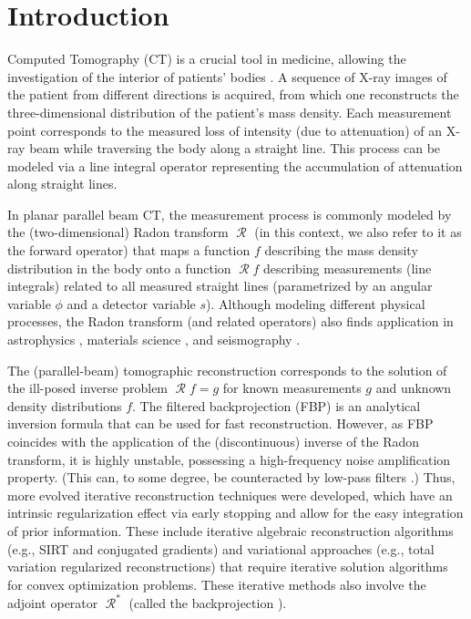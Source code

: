 \documentclass[11pt,reqno]{amsart}
\DeclareMathOperator{\Radon}{\mathcal{R}}
\numberwithin{theorem}{section}
\theoremstyle{remark}
\begin{document}
\section{Introduction}

Computed Tomography (CT) is a crucial tool in medicine, allowing the investigation of the interior of patients' bodies \cite{Ammari08_book_methematics_of_medical_imaging,Hsieh_CT_principles}.  
A sequence of X-ray images of the patient from different directions is acquired, from which one reconstructs the three-dimensional distribution of the patient's mass density.
Each measurement point corresponds to the measured loss of intensity (due to attenuation) of an X-ray beam while traversing the body along a straight line. This process can be modeled  via a line integral operator representing the accumulation of attenuation along straight lines.

 In planar parallel beam CT, the measurement process is commonly modeled by the (two-dimensional) Radon transform $\Radon$ \cite{Deans_Radon_applications_1993,helgason1999radon,Natterer:2001:MCT:500773} (in this context, we also refer to it as the forward operator) that maps a function $f$ describing the mass density distribution in the body onto a function $\Radon f$ describing measurements (line integrals) related to all measured straight lines (parametrized by an angular variable $\phi$ and a detector variable $s$). 
 Although modeling different physical processes, the Radon transform (and related operators) also finds application in astrophysics \cite{cameron2004astrotomography}, materials science \cite{leary_analytical_2016}, and seismography \cite{RAWLINSON2010101}.
 
The (parallel-beam) tomographic reconstruction corresponds to the solution of the ill-posed inverse problem $\Radon f =g$ for known measurements $g$ and unknown density distributions $f$.
The filtered backprojection (FBP) \cite{Natterer:2001:MCT:500773}  is an analytical inversion formula that can be used for fast reconstruction. However, as FBP coincides with the application of the (discontinuous) inverse of the Radon transform, it is highly unstable, possessing a high-frequency noise amplification property. (This can, to some degree, be counteracted by low-pass filters \cite{beckmann2015error}.) Thus, more evolved iterative reconstruction techniques were developed, which have an intrinsic regularization effect via early stopping and allow for the easy integration of prior information. These include iterative algebraic reconstruction algorithms (e.g., SIRT and conjugated gradients) \cite{Gilbert_Sirt,SART_ALgo,SCALES_CG_tomography_1987} and variational approaches (e.g., total variation regularized reconstructions) \cite{Scherzer:2008:VMI:1502016,Dong2013,C8NR09058K} that require iterative solution algorithms for convex optimization problems. These iterative methods also involve the adjoint operator $\Radon^*$ (called the backprojection \cite{Natterer:2001:MCT:500773}).
\end{document}

